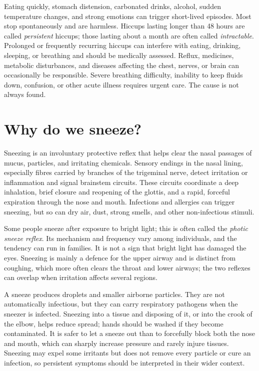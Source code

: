 \documentclass[11pt,oneside]{report}
\begin{document}
Eating quickly, stomach distension, carbonated drinks, alcohol, sudden
temperature changes, and strong emotions can trigger short-lived episodes.
Most stop spontaneously and are harmless. Hiccups lasting longer than 48 hours
are called \emph{persistent} hiccups; those lasting about a month are often
called \emph{intractable}. Prolonged or frequently recurring hiccups can
interfere with eating, drinking, sleeping, or breathing and should be medically
assessed. Reflux, medicines, metabolic disturbances, and diseases affecting
the chest, nerves, or brain can occasionally be responsible. Severe breathing
difficulty, inability to keep fluids down, confusion, or other acute illness
requires urgent care. The cause is not always found.

\section{Why do we sneeze?}

Sneezing is an involuntary protective reflex that helps clear the nasal passages
of mucus, particles, and irritating chemicals. Sensory endings in the nasal
lining, especially fibres carried by branches of the trigeminal nerve, detect
irritation or inflammation and signal brainstem circuits. These circuits
coordinate a deep inhalation, brief closure and reopening of the glottis, and a
rapid, forceful expiration through the nose and mouth. Infections and allergies
can trigger sneezing, but so can dry air, dust, strong smells, and other
non-infectious stimuli.

Some people sneeze after exposure to bright light; this is often called the
\emph{photic sneeze reflex}. Its mechanism and frequency vary among individuals,
and the tendency can run in families. It is not a sign that bright light has
damaged the eyes. Sneezing is mainly a defence for the upper airway and is
distinct from coughing, which more often clears the throat and lower airways;
the two reflexes can overlap when irritation affects several regions.

A sneeze produces droplets and smaller airborne particles. They are not
automatically infectious, but they can carry respiratory pathogens when the
sneezer is infected. Sneezing into a tissue and disposing of it, or into the
crook of the elbow, helps reduce spread; hands should be washed if they become
contaminated. It is safer to let a sneeze out than to forcefully block both the
nose and mouth, which can sharply increase pressure and rarely injure tissues.
Sneezing may expel some irritants but does not remove every particle or cure an
infection, so persistent symptoms should be interpreted in their wider context.
\end{document}
